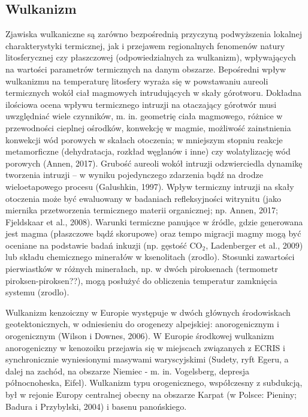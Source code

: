 \documentclass[11.5pt,twoside]{report}
\begin{document}
	\subsection{Wulkanizm}
	
Zjawiska wulkaniczne są zarówno bezpośrednią przyczyną podwyższenia lokalnej charakterystyki termicznej, jak i przejawem regionalnych fenomenów natury litosferycznej czy płaszczowej (odpowiedzialnych za wulkanizm), wpływających na wartości parametrów termicznych na danym obszarze. Bepośredni wpływ wulkanizmu na temperaturę litosfery wyraża się w powstawaniu aureoli termicznych wokół ciał magmowych intrudujących w skały górotworu. Dokładna ilościowa ocena wpływu termicznego intruzji na otaczający górotwór musi uwzględniać wiele czynników, m. in. geometrię ciała magmowego, różnice w przewodności cieplnej ośrodków, konwekcję w magmie, możliwość zainstnienia konwekcji wód porowych w skałach otoczenia; w mniejszym stopniu reakcje metamorficzne (dehydratacja, rozkład węglanów i inne) czy wolatylizację wód porowych (Annen, 2017). Grubość aureoli wokół intruzji odzwierciedla dynamikę tworzenia intruzji -- w wyniku pojedynczego zdarzenia bąd\'{z} na drodze wieloetapowego procesu (Galushkin, 1997). Wpływ termiczny intruzji na skały otoczenia może być ewaluowany w badaniach refleksyjności witrynitu (jako miernika przetworzenia termicznego materii organicznej; np. Annen, 2017; Fjeldskaar et al., 2008). Warunki termiczne panujące w \'{z}ródle, gdzie generowana jest magma (płaszczowe bąd\'{z} skorupowe) oraz tempo migracji magmy mogą być oceniane na podstawie badań inkuzji (np. gęstość CO$_{2}$, Ladenberger et al., 2009) lub składu chemicznego minerałów w ksenolitach (zrodlo). Stosunki zawartości pierwiastków w różnych minerałach, np. w dwóch piroksenach (termometr piroksen-piroksen??), mogą posłużyć do obliczenia temperatur zamknięcia systemu (zrodlo).

Wulkanizm kenzoiczny w Europie występuje w dwóch głównych środowiskach geotektonicznych, w odniesieniu do orogenezy alpejskiej: anorogenicznym i orogenicznym (Wilson i Downes, 2006). W Europie środkowej wulkanizm anorogeniczny w kenozoiku przejawia się w miejscach związanych z ECRIS i synchronicznie wyniesionymi masywami waryscyjskimi (Sudety, ryft Egeru, a dalej na zachód, na obszarze Niemiec - m. in. Vogelsberg, depresja północnoheska, Eifel). Wulkanizm typu orogenicznego, współczesny z subdukcją, był w rejonie Europy centralnej obecny na obszarze Karpat (w Polsce: Pieniny; Badura i Przybylski, 2004) i basenu panońskiego. 
\end{document}

